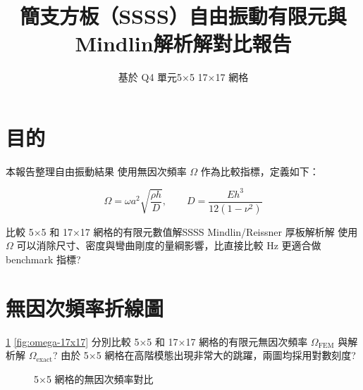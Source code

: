 \documentclass[12pt,a4paper]{article}
\begin{document}
\title{簡支方板（SSSS）自由振動有限元與Mindlin解析解對比報告}
\author{基於 Q4 單元5×5 17×17 網格}
\date{}
\maketitle

\section{目的}

本報告整理自由振動結果
使用無因次頻率 \(\Omega\) 作為比較指標，定義如下：

\[
\Omega = \omega a^2 \sqrt{\frac{\rho h}{D}}, \qquad 
D = \frac{E h^3}{12(1-\nu^2)}
\]

比較 5×5 和 17×17 網格的有限元數值解SSSS Mindlin/Reissner 厚板解析解
使用 \(\Omega\) 可以消除尺寸、密度與彎曲剛度的量綱影響，比直接比較 Hz 更適合做 benchmark 指標?

\section{無因次頻率折線圖}

\ref{fig:omega-5x5} \ref{fig:omega-17x17} 分別比較 5×5 和 17×17 網格的有限元無因次頻率 \(\Omega_{\mathrm{FEM}}\) 與解析解 \(\Omega_{\mathrm{exact}}\)?
由於 5×5 網格在高階模態出現非常大的跳躍，兩圖均採用對數刻度?

\begin{figure}[htbp]
\centering
{}
\caption{5×5 網格的無因次頻率對比}
\label{fig:omega-5x5}
\end{figure}
\end{document}
